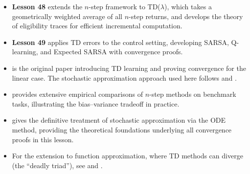 \documentclass[11pt,a4paper]{article}
\begin{document}
\begin{itemize}
  \item \textbf{Lesson 48} extends the $n$-step framework to
    TD($\lambda$), which takes a geometrically weighted average of all
    $n$-step returns, and develops the theory of eligibility traces for
    efficient incremental computation.

  \item \textbf{Lesson 49} applies TD errors to the control setting,
    developing SARSA, Q-learning, and Expected SARSA with convergence
    proofs.

  \item \citet{sutton1988} is the original paper introducing TD learning
    and proving convergence for the linear case. The stochastic
    approximation approach used here follows \citet{tsitsiklis1994} and
    \citet{jaakkola1994}.

  \item \citet[Chapter 7]{suttonbarto2018} provides extensive empirical
    comparisons of $n$-step methods on benchmark tasks, illustrating the
    bias--variance tradeoff in practice.

  \item \citet{borkar2008} gives the definitive treatment of stochastic
    approximation via the ODE method, providing the theoretical
    foundations underlying all convergence proofs in this lesson.

  \item For the extension to function approximation, where TD methods
    can diverge (the ``deadly triad''), see \citet{tsitsiklis1997}
    and \citet{baird1995}.
\end{itemize}


\end{document}
